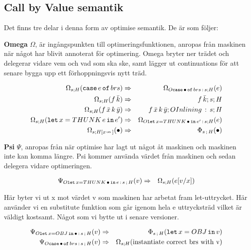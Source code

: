 \documentclass[../Optimise]{subfiles}
\begin{document}
\subsection{Call by Value semantik}


Det finns tre delar i denna form av optimise semantik. De är som följer:

\textbf{Omega} $\Omega$, är ingångspunkten till optimeringsfunktionen, anropas från maskinen
när något har blivit annoterat för optimering. Omega bryter ner trädet
och delegerar vidare vem och vad som ska ske, samt lägger ut continuations
för att senare bygga upp ett förhoppningsvis nytt träd.

\begin{align*}
\Omega_{s;H}(\mathtt{case}\,e\,\mathtt{of}\,brs) & \Rightarrow & \Omega_{O\mathtt{case}\,\bullet\,\mathtt{of}\,brs\,:\,s;H}(e)\\
\Omega_{s;H}(f\,\bar{k}) & \Rightarrow & f\,\bar{k};s;H\\
\Omega_{s;H}(f\,\bar{x}\, k\,\bar{y}) & \Rightarrow & f\,\bar{x}\, k\,\bar{y};OInlining\,:\,s;H\\
\Omega_{s;H}(\mathtt{let}\,x=THUNK\,e\,\mathtt{in}\,e') & \Rightarrow & \Omega_{O\mathtt{let\,}x=THUNK\,\bullet\,\mathtt{in}\,e'\,:\,s;H}(e)\\
\Omega_{s;H[x\nrightarrow\,]}(\bullet) & \Rightarrow & \Phi_{s\,;\,H}(\bullet)
\end{align*}


\textbf{Psi} $\Psi$, anropas från när optimise har lagt ut något åt maskinen och
maskinen inte kan komma längre. Psi kommer använda värdet från maskinen
och sedan delegera vidare optimeringen.

\begin{align*}
\Psi_{O\mathtt{let\,}x=THUNK\,\bullet\,\mathtt{in}\,e\,:\,s\,;\,H}(v) & \Rightarrow & \Omega_{s;H}(e[v/x])
\end{align*}


Här byter vi ut x mot värdet v som maskinen har arbetat fram let-uttrycket.
Här använder vi en substitute funktion som går igenom hela e uttrycksträd
vilket är väldigt kostsamt. Något som vi bytte ut i senare versioner.

\begin{align*}
\Psi_{O\mathtt{let\,}x=OBJ\,\mathtt{in}\,\bullet\,:\,s\,;\,H}(v) & \Rightarrow & \Phi_{s\,;\,H}(\mathtt{let}\,x=OBJ\,\mathtt{in}\,v)\\
\Psi_{O\mathtt{case}\,\bullet\,\mathtt{of}\,brs\,:\,s\,;\,H}(v) & \Rightarrow & \Omega_{s;H}(\text{instantiate correct brs with v})\end{align*}
\end{document}
